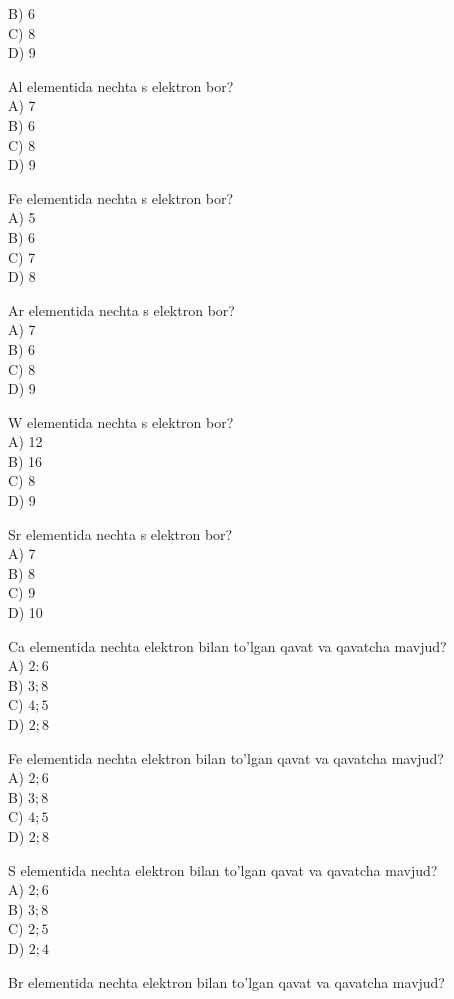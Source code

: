 B) 6\\
C) 8\\
D) 9
  \item Al elementida nechta s elektron bor?\\
A) 7\\
B) 6\\
C) 8\\
D) 9
  \item Fe elementida nechta s elektron bor?\\
A) 5\\
B) 6\\
C) 7\\
D) 8
  \item Ar elementida nechta s elektron bor?\\
A) 7\\
B) 6\\
C) 8\\
D) 9
  \item W elementida nechta s elektron bor?\\
A) 12\\
B) 16\\
C) 8\\
D) 9
  \item Sr elementida nechta s elektron bor?\\
A) 7\\
B) 8\\
C) 9\\
D) 10
  \item Ca elementida nechta elektron bilan to'lgan qavat va qavatcha mavjud?\\
A) $2: 6$\\
B) $3 ; 8$\\
C) $4 ; 5$\\
D) $2 ; 8$\\
  \item Fe elementida nechta elektron bilan to'lgan qavat va qavatcha mavjud?\\
A) $2 ; 6$\\
B) $3 ; 8$\\
C) $4 ; 5$\\
D) $2 ; 8$
  \item S elementida nechta elektron bilan to'lgan qavat va qavatcha mavjud?\\
A) $2 ; 6$\\
B) $3 ; 8$\\
C) $2 ; 5$\\
D) $2 ; 4$
  \item Br elementida nechta elektron bilan to'lgan qavat va qavatcha mavjud?\\

